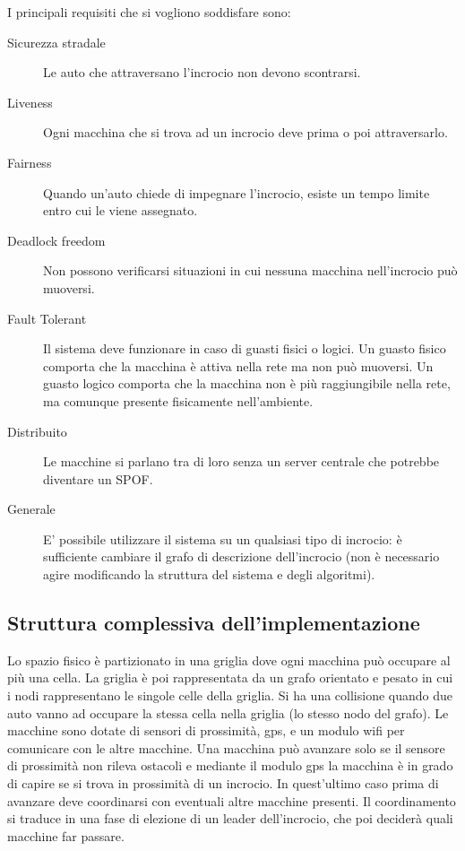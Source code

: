 \documentclass{memoir}
\begin{document}
I principali requisiti che si vogliono soddisfare sono:
\begin{description}
\item[Sicurezza stradale] Le auto che attraversano l'incrocio non devono
  scontrarsi.
\item[Liveness] Ogni macchina che si trova ad un incrocio deve prima o poi
  attraversarlo.
\item[Fairness] Quando un'auto chiede di impegnare l'incrocio, esiste un tempo
  limite entro cui le viene assegnato.
\item[Deadlock freedom] Non possono verificarsi situazioni in cui nessuna
  macchina nell'incrocio può muoversi.
\item [Fault Tolerant] Il sistema deve funzionare in caso di guasti fisici o
  logici. Un guasto fisico comporta che la macchina è attiva nella rete ma non
  può muoversi. Un guasto logico comporta che la macchina non è più
  raggiungibile nella rete, ma comunque presente fisicamente nell'ambiente.
\item [Distribuito] Le macchine si parlano tra di loro senza un server centrale
  che potrebbe diventare un SPOF.
\item [Generale] E' possibile utilizzare il sistema su un qualsiasi tipo di
  incrocio: è sufficiente cambiare il grafo di descrizione dell'incrocio (non è
  necessario agire modificando la struttura del sistema e degli algoritmi).
\end{description}

\subsection{Struttura complessiva dell'implementazione}

Lo spazio fisico è partizionato in una griglia dove ogni macchina può occupare
al più una cella. La griglia è poi rappresentata da un grafo orientato e pesato
in cui i nodi rappresentano le singole celle della griglia. Si ha una collisione
quando due auto vanno ad occupare la stessa cella nella griglia (lo stesso nodo
del grafo). Le macchine sono dotate di sensori di prossimità, gps, e un modulo
wifi per comunicare con le altre macchine. Una macchina può avanzare solo se il
sensore di prossimità non rileva ostacoli e mediante il modulo gps la macchina è
in grado di capire se si trova in prossimità di un incrocio. In quest'ultimo
caso prima di avanzare deve coordinarsi con eventuali altre macchine presenti.
Il coordinamento si traduce in una fase di elezione di un leader dell'incrocio,
che poi deciderà quali macchine far passare.
\end{document}
